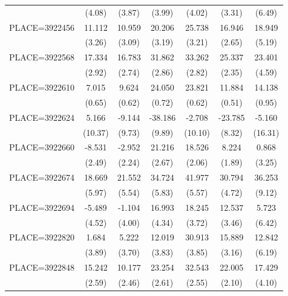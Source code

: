 {\begin{tabular}{l*{6}{c}}
                    &      (4.08)&      (3.87)&      (3.99)&      (4.02)&      (3.31)&      (6.49)\\
PLACE=3922456       &      11.112&      10.959&      20.206&      25.738&      16.946&      18.949\\
                    &      (3.26)&      (3.09)&      (3.19)&      (3.21)&      (2.65)&      (5.19)\\
PLACE=3922568       &      17.334&      16.783&      31.862&      33.262&      25.337&      23.401\\
                    &      (2.92)&      (2.74)&      (2.86)&      (2.82)&      (2.35)&      (4.59)\\
PLACE=3922610       &       7.015&       9.624&      24.050&      23.821&      11.884&      14.138\\
                    &      (0.65)&      (0.62)&      (0.72)&      (0.62)&      (0.51)&      (0.95)\\
PLACE=3922624       &       5.166&      -9.144&     -38.186&      -2.708&     -23.785&      -5.160\\
                    &     (10.37)&      (9.73)&      (9.89)&     (10.10)&      (8.32)&     (16.31)\\
PLACE=3922660       &      -8.531&      -2.952&      21.216&      18.526&       8.224&       0.868\\
                    &      (2.49)&      (2.24)&      (2.67)&      (2.06)&      (1.89)&      (3.25)\\
PLACE=3922674       &      18.669&      21.552&      34.724&      41.977&      30.794&      36.253\\
                    &      (5.97)&      (5.54)&      (5.83)&      (5.57)&      (4.72)&      (9.12)\\
PLACE=3922694       &      -5.489&      -1.104&      16.993&      18.245&      12.537&       5.723\\
                    &      (4.52)&      (4.00)&      (4.34)&      (3.72)&      (3.46)&      (6.42)\\
PLACE=3922820       &       1.684&       5.222&      12.019&      30.913&      15.889&      12.842\\
                    &      (3.89)&      (3.70)&      (3.83)&      (3.85)&      (3.16)&      (6.19)\\
PLACE=3922848       &      15.242&      10.177&      23.254&      32.543&      22.005&      17.429\\
                    &      (2.59)&      (2.46)&      (2.61)&      (2.55)&      (2.10)&      (4.10)\\

\end{tabular}}
